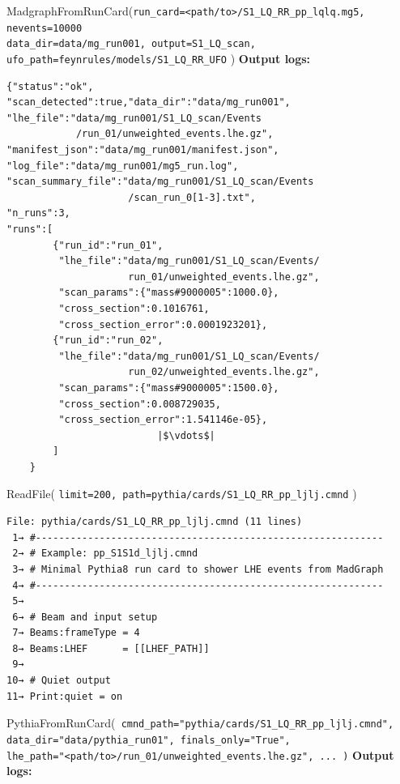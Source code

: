 \documentclass[11pt,oneside]{article}
\numberwithin{equation}{section}
\begin{document}
\begin{orchestralagentmessage}
    \begin{orchestraltoolmessageml}{MadgraphFromRunCard(\texttt{run\_card=<path/to>/S1\_LQ\_RR\_pp\_lqlq.mg5, nevents=10000} \\\hphantom{MadgraphFromRunCard(}\texttt{data\_dir=data/mg\_run001, output=S1\_LQ\_scan,}\\\hphantom{MadgraphFromRunCard(}\texttt{ufo\_path=feynrules/models/S1\_LQ\_RR\_UFO} )}
        \textbf{Output logs:} \vspace{-0.2in}
\begin{verbatim}
{"status":"ok",
"scan_detected":true,"data_dir":"data/mg_run001",
"lhe_file":"data/mg_run001/S1_LQ_scan/Events
            /run_01/unweighted_events.lhe.gz",
"manifest_json":"data/mg_run001/manifest.json",
"log_file":"data/mg_run001/mg5_run.log",
"scan_summary_file":"data/mg_run001/S1_LQ_scan/Events
                     /scan_run_0[1-3].txt",
"n_runs":3,
"runs":[
        {"run_id":"run_01",
         "lhe_file":"data/mg_run001/S1_LQ_scan/Events/
                     run_01/unweighted_events.lhe.gz",
         "scan_params":{"mass#9000005":1000.0},
         "cross_section":0.1016761,
         "cross_section_error":0.0001923201},
        {"run_id":"run_02",
         "lhe_file":"data/mg_run001/S1_LQ_scan/Events/
                     run_02/unweighted_events.lhe.gz",
         "scan_params":{"mass#9000005":1500.0},
         "cross_section":0.008729035,
         "cross_section_error":1.541146e-05},
                          |$\vdots$|
        ]
    }
\end{verbatim}
    \end{orchestraltoolmessageml}


    \begin{orchestraltoolmessage}{ReadFile( \texttt{limit=200, path=pythia/cards/S1\_LQ\_RR\_pp\_ljlj.cmnd} )}
\begin{verbatim}
File: pythia/cards/S1_LQ_RR_pp_ljlj.cmnd (11 lines)
 1→ #------------------------------------------------------------
 2→ # Example: pp_S1S1d_ljlj.cmnd
 3→ # Minimal Pythia8 run card to shower LHE events from MadGraph
 4→ #------------------------------------------------------------
 5→ 
 6→ # Beam and input setup
 7→ Beams:frameType = 4
 8→ Beams:LHEF      = [[LHEF_PATH]]
 9→ 
10→ # Quiet output
11→ Print:quiet = on
\end{verbatim}
    \end{orchestraltoolmessage}


    \begin{orchestraltoolmessageml}{PythiaFromRunCard(\texttt{ cmnd\_path="pythia/cards/S1\_LQ\_RR\_pp\_ljlj.cmnd",}\\\hphantom{PythiaFromRunCard(} 
    \texttt{data\_dir="data/pythia\_run01", finals\_only="True",}\\\hphantom{PythiaFromRunCard(} \texttt{lhe\_path="<path/to>/run\_01/unweighted\_events.lhe.gz", ... )}}
        \textbf{Output logs:}\vspace{-0.2in}


\end{orchestraltoolmessageml}
\end{orchestralagentmessage}
\end{document}
